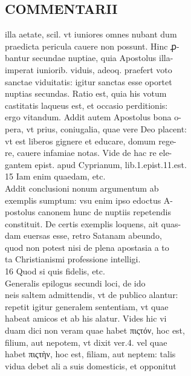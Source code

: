 \documentclass{article}
\begin{document}
\begin{pages}
\section*{COMMENTARII \\
                }
illa aetate, scil. vt iuniores omnes nubant dum \\
                praedicta pericula cauere non possunt. Hinc ꝓ- \\
                bantur secundae nuptiae, quia Apostolus illa- \\
                imperat iuniorib. viduis, adeoq. praefert voto \\
                sanctae viduitatis: igitur sanctas esse oportet \\
                nuptias secundas. Ratio est, quia his votum \\
                castitatis laqueus est, et occasio perditionis: \\
                ergo vitandum. Addit autem Apostolus bona o- \\
                pera, vt prius, coniugalia, quae vere Deo placent: \\
                vt est liberos gignere et educare, domum rege- \\
                re, cauere infamiae notas. Vide de hac re ele- \\
                gantem epist. apud Cyprianum, lib.1.epist.11.est. \\
                15 Iam enim quaedam, etc. \\
                Addit conclusioni nonum argumentum ab \\
                exemplis sumptum: vsu enim ipso edoctus A- \\
                postolus canonem hunc de nuptiis repetendis \\
                constituit. De certis exemplis loquens, ait quas- \\
                dam euersas esse, retro Satanam abeundo, \\
                quod non potest nisi de plena apostasia a to \\
                ta Christianismi professione intelligi. \\
                16 Quod si quis fidelis, etc. \\
                Generalis epilogus secundi loci, de ido \\
                neis saltem admittendis, vt de publico alantur: \\
                repetit igitur generalem sententiam, vt quae \\
                habeat amicos et ab his alatur. Vides hic vi \\
                duam dici non veram quae habet πιςτόν, hoc est, \\
                filium, aut nepotem, vt dixit ver.4. vel quae \\
                habet πιςτὴν, hoc est, filiam, aut neptem: talis \\
                vidua debet ali a suis domesticis, et opponitut \\
                

\end{pages}
\end{document}
